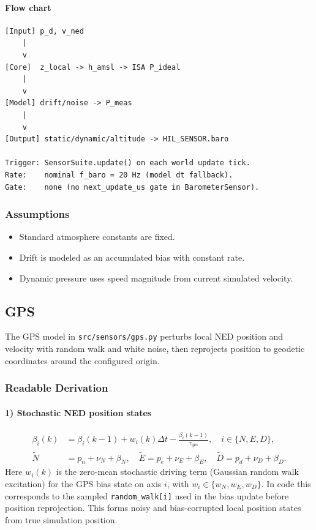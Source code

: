 \documentclass[11pt,a4paper]{article}
\begin{document}
\paragraph{Flow chart}
{\footnotesize
\begin{verbatim}
[Input] p_d, v_ned
    |
    v
[Core]  z_local -> h_amsl -> ISA P_ideal
    |
    v
[Model] drift/noise -> P_meas
    |
    v
[Output] static/dynamic/altitude -> HIL_SENSOR.baro

Trigger: SensorSuite.update() on each world update tick.
Rate:    nominal f_baro = 20 Hz (model dt fallback).
Gate:    none (no next_update_us gate in BarometerSensor).
\end{verbatim}
}

\subsubsection*{Assumptions}
\begin{itemize}
    \item Standard atmosphere constants are fixed.
    \item Drift is modeled as an accumulated bias with constant rate.
    \item Dynamic pressure uses speed magnitude from current simulated velocity.
\end{itemize}

\subsection{GPS}
The GPS model in \texttt{src/sensors/gps.py} perturbs local NED position and velocity with random walk and white noise, then reprojects position to geodetic coordinates around the configured origin.

\subsubsection*{Readable Derivation}
\paragraph{1) Stochastic NED position states}
\begin{align}
\beta_i(k) &= \beta_i(k-1)+w_i(k)\Delta t-\frac{\beta_i(k-1)}{\tau_{gps}}, \quad i\in\{N,E,D\}, \\
\tilde{N} &= p_n + \nu_N + \beta_N, \quad
\tilde{E}=p_e + \nu_E + \beta_E, \quad
\tilde{D}=p_d + \nu_D + \beta_D.
\end{align}
Here $w_i(k)$ is the zero-mean stochastic driving term (Gaussian random walk excitation) for the GPS bias state on axis $i$, with $w_i\in\{w_N,w_E,w_D\}$.
In code this corresponds to the sampled \texttt{random\_walk[i]} used in the bias update before position reprojection.
This forms noisy and bias-corrupted local position states from true simulation position.
\end{document}

